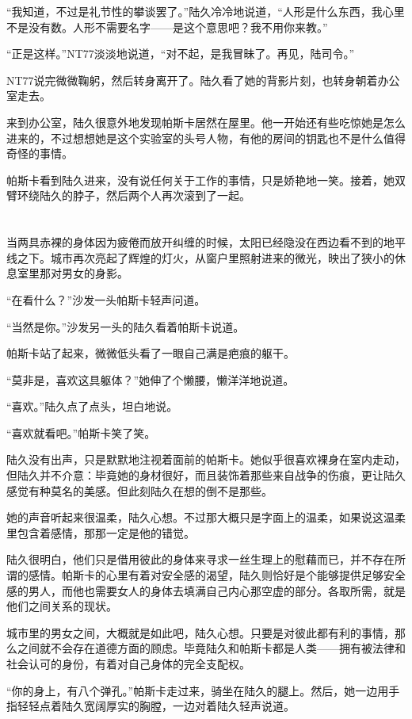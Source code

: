 “我知道，不过是礼节性的攀谈罢了。”陆久冷冷地说道，“人形是什么东西，我心里不是没有数。人形不需要名字——是这个意思吧？我不用你来教。”

“正是这样。”NT77淡淡地说道，“对不起，是我冒昧了。再见，陆司令。”

NT77说完微微鞠躬，然后转身离开了。陆久看了她的背影片刻，也转身朝着办公室走去。

来到办公室，陆久很意外地发现帕斯卡居然在屋里。他一开始还有些吃惊她是怎么进来的，不过想想她是这个实验室的头号人物，有他的房间的钥匙也不是什么值得奇怪的事情。

帕斯卡看到陆久进来，没有说任何关于工作的事情，只是娇艳地一笑。接着，她双臂环绕陆久的脖子，然后两个人再次滚到了一起。\section*{}

当两具赤裸的身体因为疲倦而放开纠缠的时候，太阳已经隐没在西边看不到的地平线之下。城市再次亮起了辉煌的灯火，从窗户里照射进来的微光，映出了狭小的休息室里那对男女的身影。

“在看什么？”沙发一头帕斯卡轻声问道。

“当然是你。”沙发另一头的陆久看着帕斯卡说道。

帕斯卡站了起来，微微低头看了一眼自己满是疤痕的躯干。

“莫非是，喜欢这具躯体？”她伸了个懒腰，懒洋洋地说道。

“喜欢。”陆久点了点头，坦白地说。

“喜欢就看吧。”帕斯卡笑了笑。

陆久没有出声，只是默默地注视着面前的帕斯卡。她似乎很喜欢裸身在室内走动，但陆久并不介意：毕竟她的身材很好，而且装饰着那些来自战争的伤痕，更让陆久感觉有种莫名的美感。但此刻陆久在想的倒不是那些。

她的声音听起来很温柔，陆久心想。不过那大概只是字面上的温柔，如果说这温柔里包含着感情，那那一定是他的错觉。

陆久很明白，他们只是借用彼此的身体来寻求一丝生理上的慰藉而已，并不存在所谓的感情。帕斯卡的心里有着对安全感的渴望，陆久则恰好是个能够提供足够安全感的男人，而他也需要女人的身体去填满自己内心那空虚的部分。各取所需，就是他们之间关系的现状。

城市里的男女之间，大概就是如此吧，陆久心想。只要是对彼此都有利的事情，那么之间就不会存在道德方面的顾虑。毕竟陆久和帕斯卡都是人类——拥有被法律和社会认可的身份，有着对自己身体的完全支配权。

“你的身上，有八个弹孔。”帕斯卡走过来，骑坐在陆久的腿上。然后，她一边用手指轻轻点着陆久宽阔厚实的胸膛，一边对着陆久轻声说道。

